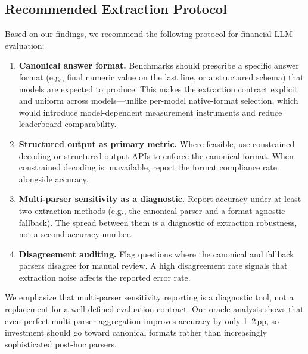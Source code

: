 \subsection{Recommended Extraction Protocol}
\label{sec:protocol}

Based on our findings, we recommend the following protocol for financial LLM evaluation:

\begin{enumerate}
    \item \textbf{Canonical answer format.} Benchmarks should prescribe a specific answer format (e.g., final numeric value on the last line, or a structured schema) that models are expected to produce. This makes the extraction contract explicit and uniform across models---unlike per-model native-format selection, which would introduce model-dependent measurement instruments and reduce leaderboard comparability.
    \item \textbf{Structured output as primary metric.} Where feasible, use constrained decoding or structured output APIs to enforce the canonical format. When constrained decoding is unavailable, report the format compliance rate alongside accuracy.
    \item \textbf{Multi-parser sensitivity as a diagnostic.} Report accuracy under at least two extraction methods (e.g., the canonical parser and a format-agnostic fallback). The spread between them is a diagnostic of extraction robustness, not a second accuracy number.
    \item \textbf{Disagreement auditing.} Flag questions where the canonical and fallback parsers disagree for manual review. A high disagreement rate signals that extraction noise affects the reported error rate.
\end{enumerate}

We emphasize that multi-parser sensitivity reporting is a diagnostic tool, not a replacement for a well-defined evaluation contract. Our oracle analysis shows that even perfect multi-parser aggregation improves accuracy by only 1--2\,pp, so investment should go toward canonical formats rather than increasingly sophisticated post-hoc parsers.
